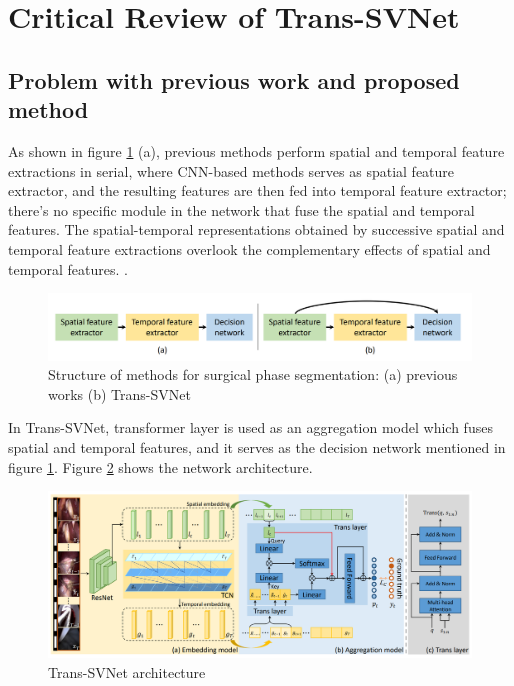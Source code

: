\documentclass[11pt]{article} \usepackage[top=1in, bottom=1in, left=1in, right=1in]{geometry}
\begin{document}
\section{Critical Review of Trans-SVNet}
\subsection{Problem with previous work and proposed method}
As shown in figure \ref{fig:transsvnet_structure} (a), previous methods perform spatial and temporal feature extractions in serial, where CNN-based methods serves as spatial feature extractor, and the resulting features are then fed into temporal feature extractor; there's no specific module in the network that fuse the spatial and temporal features. The spatial-temporal representations obtained by successive spatial and temporal feature extractions overlook the complementary effects of spatial and temporal features. \cite{TransSVNet}.

\begin{figure}[H]
  \includegraphics[width=\textwidth]{trans_svnet_1.png}
  \centering
  \caption{ Structure of methods for surgical phase segmentation: (a) previous works (b) Trans-SVNet \cite{TransSVNet}}
  \label{fig:transsvnet_structure}
\end{figure}

\vspace{0.25cm}
\noindent
In Trans-SVNet, transformer layer is used as an aggregation model which fuses spatial and temporal features, and it serves as the decision network mentioned in figure \ref{fig:transsvnet_structure}. Figure \ref{fig:transsvnet_network} shows the network architecture.

\begin{figure}[H]
  \includegraphics[width=\textwidth]{trans_svnet_2.png}
  \centering
  \caption{ Trans-SVNet architecture\cite{TransSVNet}}
  \label{fig:transsvnet_network}
\end{figure}
\end{document}
